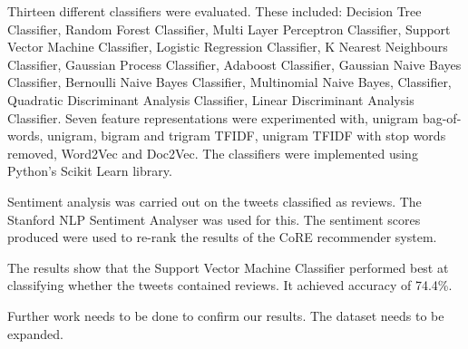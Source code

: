 Thirteen different classifiers were evaluated. These included: Decision Tree Classifier, Random Forest Classifier, Multi Layer Perceptron Classifier, Support Vector Machine Classifier, Logistic Regression Classifier, K Nearest Neighbours Classifier, Gaussian Process Classifier, Adaboost Classifier, Gaussian Naive Bayes Classifier, Bernoulli Naive Bayes Classifier, Multinomial Naive Bayes, Classifier, Quadratic Discriminant Analysis Classifier, Linear Discriminant Analysis Classifier. Seven feature representations were experimented with, unigram bag-of-words, unigram, bigram and trigram TFIDF, unigram TFIDF with stop words removed, Word2Vec and Doc2Vec. The classifiers were implemented using Python's Scikit Learn library.

Sentiment analysis was carried out on the tweets classified as reviews. The Stanford NLP Sentiment Analyser was used for this. The sentiment scores produced were used to re-rank the results of the CoRE recommender system.

The results show that the Support Vector Machine Classifier performed best at classifying whether the tweets contained reviews. It achieved accuracy of 74.4\%.

Further work needs to be done to confirm our results. The dataset needs to be expanded.